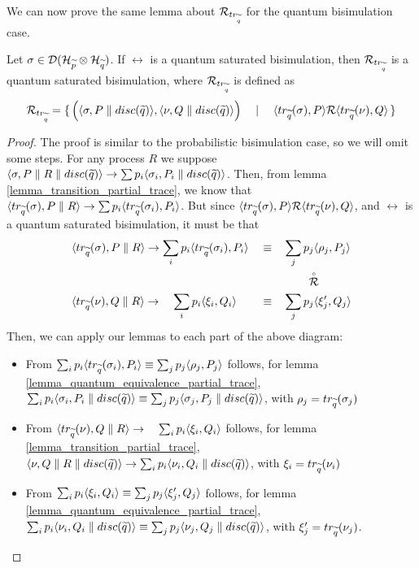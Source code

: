 We can now prove the same lemma about $\mathcal{R}_{tr_{\widetilde{q}}}$ for the quantum bisimulation case.

\begin{lemma}\label{lemma_reltrq_quantum}
Let $\sigma \in \mathcal{D}(\mathcal{H}_{\widetilde{p}} \otimes \mathcal{H}_{\widetilde{q}})$. If $\rel$ is a quantum saturated bisimulation, then $\mathcal{R}_{tr_{\widetilde{q}}}$ is a quantum saturated bisimulation, where $\mathcal{R}_{tr_{\widetilde{q}}}$ is defined as
\[\mathcal{R}_{tr_{\widetilde{q}}} = \set{\Big(\langle\sigma, P \parallel disc(\widetilde{q})\rangle, \langle\nu, Q \parallel disc(\widetilde{q})\rangle\Big) \quad\mid\quad \langle tr_{\widetilde{q}}(\sigma), P\rangle \mathcal{R}\langle tr_{\widetilde{q}}(\nu), Q\rangle}\]
\end{lemma}
\begin{proof}
The proof is similar to the probabilistic bisimulation case, so we will omit some steps.
For any process $R$ we suppose $\langle\sigma, P \parallel R \parallel disc(\widetilde{q})\rangle \rightarrow \sum p_i \langle\sigma_i, P_i \parallel disc(\widetilde{q})\rangle$. Then, from lemma \ref{lemma_transition_partial_trace}, we know that $\langle tr_{\widetilde{q}}(\sigma), P\parallel R\rangle \rightarrow \sum p_i \langle tr_{\widetilde{q}}(\sigma_i), P_i\rangle$. But since $\langle tr_{\widetilde{q}}(\sigma), P\rangle \mathcal{R} \langle tr_{\widetilde{q}}(\nu), Q\rangle$, and $\rel$ is a quantum saturated bisimulation, it must be that 
\begin{align*}
& \langle tr_{\widetilde{q}}(\sigma), P\parallel R\rangle \rightarrow \sum_i p_i \langle tr_{\widetilde{q}}(\sigma_i), P_i\rangle & & \equiv  &  & \sum_j p_j \langle\rho_j, P_j\rangle 
\\
 & & & & & \qquad\stackrel{\scriptscriptstyle \circ}{\mathcal{R}} 
\\
& \langle tr_{\widetilde{q}}(\nu), Q\parallel R\rangle \rightarrow \quad\sum_i p_i \langle\xi_i, Q_i\rangle & & \equiv & &  \sum_j p_j \langle\xi'_j, Q_j\rangle 
\end{align*} 
Then, we can apply our lemmas to each part of the above diagram: \begin{itemize}
\item From $\sum_i p_i \langle tr_{\widetilde{q}}(\sigma_i), P_i\rangle \equiv \sum_j p_j \langle\rho_j, P_j\rangle$ follows, for lemma \ref{lemma_quantum_equivalence_partial_trace}, $\sum_i p_i \langle\sigma_i, P_i\parallel disc(\widetilde{q})\rangle \equiv  \sum_j p_j \langle\sigma_j, P_j\parallel disc(\widetilde{q})\rangle$, with $\rho_j = tr_{\widetilde{q}}(\sigma_j)$
\item From $\langle tr_{\widetilde{q}}(\nu), Q\parallel R\rangle \rightarrow \quad\sum_i p_i \langle\xi_i, Q_i\rangle$ follows, for lemma \ref{lemma_transition_partial_trace}, $\langle\nu, Q\parallel R\parallel disc(\widetilde{q})\rangle \rightarrow \sum_i p_i \langle\nu_i, Q_i\parallel disc(\widetilde{q})\rangle$, with $\xi_i = tr_{\widetilde{q}}(\nu_i)$
\item From $\sum_i p_i \langle\xi_i, Q_i\rangle \equiv  \sum_j p_j \langle\xi'_j, Q_j\rangle$ follows, for lemma \ref{lemma_quantum_equivalence_partial_trace}, $\sum_i p_i \langle\nu_i, Q_i\parallel disc(\widetilde{q})\rangle \equiv  \sum_j p_j \langle\nu_j, Q_j\parallel disc(\widetilde{q})\rangle$, with $\xi'_j = tr_{\widetilde{q}}(\nu_j)$. 

\end{itemize}
\end{proof}
